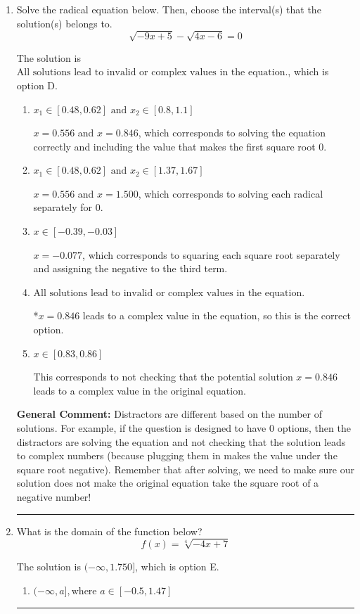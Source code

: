 \documentclass{extbook}[14pt]
\newcommand{\litem}[1]{\item #1

\rule{\textwidth}{0.4pt}}
\begin{document}
\begin{enumerate}\litem{
Solve the radical equation below. Then, choose the interval(s) that the solution(s) belongs to.
\[ \sqrt{-9 x + 5} - \sqrt{4 x - 6} = 0 \]

The solution is \( \text{All solutions lead to invalid or complex values in the equation.} \), which is option D.\begin{enumerate}[label=\Alph*.]
\item \( x_1 \in [0.48, 0.62] \text{ and } x_2 \in [0.8,1.1] \)

$x = 0.556$ and $x = 0.846$, which corresponds to solving the equation correctly and including the value that makes the first square root 0.
\item \( x_1 \in [0.48, 0.62] \text{ and } x_2 \in [1.37,1.67] \)

$x = 0.556$ and $x = 1.500$, which corresponds to solving each radical separately for 0.
\item \( x \in [-0.39,-0.03] \)

$x = -0.077$, which corresponds to squaring each square root separately and assigning the negative to the third term.
\item \( \text{All solutions lead to invalid or complex values in the equation.} \)

*$x = 0.846$ leads to a complex value in the equation, so this is the correct option.
\item \( x \in [0.83,0.86] \)

This corresponds to not checking that the potential solution $x = 0.846$ leads to a complex value in the original equation.
\end{enumerate}

\textbf{General Comment:} Distractors are different based on the number of solutions. For example, if the question is designed to have 0 options, then the distractors are solving the equation and not checking that the solution leads to complex numbers (because plugging them in makes the value under the square root negative). Remember that after solving, we need to make sure our solution does not make the original equation take the square root of a negative number!
}
\litem{
What is the domain of the function below?
\[ f(x) = \sqrt[4]{-4 x + 7} \]

The solution is \( (-\infty, 1.750] \), which is option E.\begin{enumerate}[label=\Alph*.]
\item \( (-\infty, a], \text{where } a \in [-0.5, 1.47] \)


\end{enumerate}}
\end{enumerate}
\end{document}
